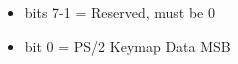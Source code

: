 \begin{itemize}
\item bits 7-1 = Reserved, must be 0
\item bit 0 = PS/2 Keymap Data MSB
\end{itemize}

